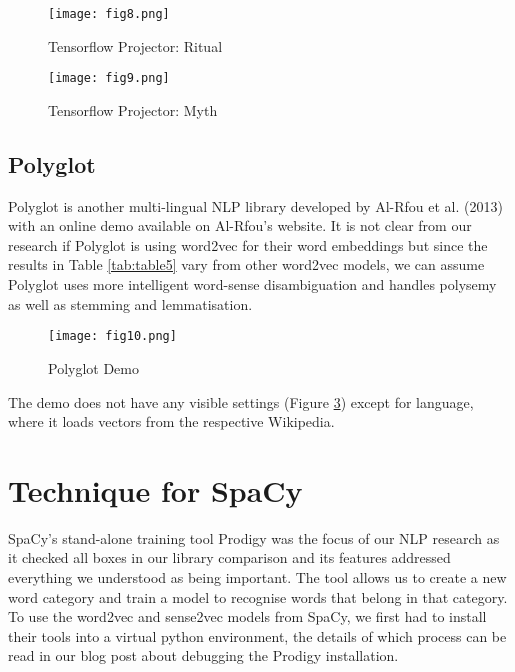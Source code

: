 \documentclass[12pt, usenames, dvipsnames]{report}
\begin{document}
\begin{flushleft}
\vspace*{1.2em}
\begin{figure}[!htbp]
  \hspace*{-3.666em}
  \texttt{[image: fig8.png]}
  \caption{Tensorflow Projector: Ritual}
  \label{fig:figure8}
\end{figure}
\vspace*{1.2em}

\vspace*{1.2em}
\begin{figure}[!htbp]
  \hspace*{-3.666em}
  \texttt{[image: fig9.png]}
  \caption{Tensorflow Projector: Myth}
  \label{fig:figure9}
\end{figure}
\vspace*{1.2em}

\subsection{Polyglot}

Polyglot is another multi-lingual NLP library developed by Al-Rfou et al. (2013) \cite{alrfou2013} with an online demo available on Al-Rfou’s website.
It is not clear from our research if Polyglot is using word2vec for their word embeddings but since the results in Table \ref{tab:table5} vary from other word2vec models, we can assume Polyglot uses more intelligent word-sense disambiguation and handles polysemy as well as stemming and lemmatisation.

\vspace*{1.2em}
\begin{figure}[!htbp]
  \hspace*{-3.666em}
  \texttt{[image: fig10.png]}
  \caption{Polyglot Demo}
  \label{fig:figure10}
\end{figure}
\vspace*{1.2em}

The demo does not have any visible settings (Figure \ref{fig:figure10}) except for language, where it loads vectors from the respective Wikipedia.


\section{Technique for SpaCy}

SpaCy’s stand-alone training tool Prodigy was the focus of our NLP research as it checked all boxes in our library comparison and its features addressed everything we understood as being important.
The tool allows us to create a new word category and train a model to recognise words that belong in that category.
To use the word2vec and sense2vec models from SpaCy, we first had to install their tools into a virtual python environment, the details of which process can be read in our blog post about debugging the Prodigy installation.


\end{flushleft}
\end{document}
